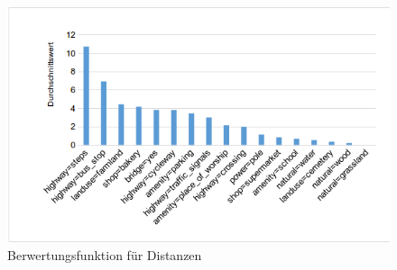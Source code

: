 \begin{figure}[H]
\begin{center}
\includegraphics[width=150mm]{images/ch6_img07_result1.png}
\caption{Berwertungsfunktion für Distanzen}
\label{img:ch6_img07_result1}
\end{center}
\end{figure}